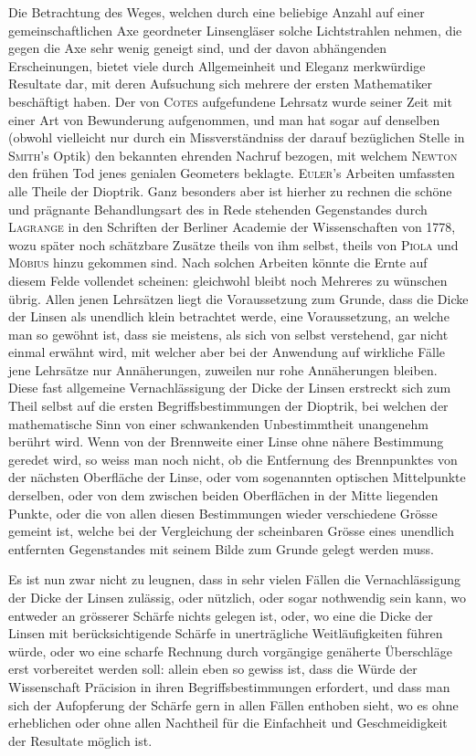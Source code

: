 Die Betrachtung des Weges, welchen durch eine beliebige Anzahl auf einer
gemeinschaftlichen Axe geordneter Linsengläser solche Lichtstrahlen nehmen, die
gegen die Axe sehr wenig geneigt sind, und der davon abhängenden Erscheinungen,
bietet viele durch Allgemeinheit und Eleganz merkwürdige Resultate
dar, mit deren Aufsuchung sich mehrere der ersten Mathematiker beschäftigt
haben. Der von \textsc{Cotes} aufgefundene Lehrsatz wurde seiner Zeit mit einer Art
von Bewunderung aufgenommen, und man hat sogar auf denselben (obwohl
vielleicht nur durch ein Missverständniss der darauf bezüglichen Stelle in \textsc{Smith}’s
Optik) den bekannten ehrenden Nachruf bezogen, mit welchem \textsc{Newton} den
frühen Tod jenes genialen Geometers beklagte. \textsc{Euler}’s Arbeiten umfassten alle
Theile der Dioptrik. Ganz besonders aber ist hierher zu rechnen die schöne
und prägnante Behandlungsart des in Rede stehenden Gegenstandes durch \textsc{Lagrange}
in den Schriften der Berliner Academie der Wissenschaften von 1778,
wozu später noch schätzbare Zusätze theils von ihm selbst, theils von \textsc{Piola}
und \textsc{Möbius} hinzu gekommen sind. Nach solchen Arbeiten könnte die Ernte
auf diesem Felde vollendet
\clearpage
{}
\noindent
scheinen: gleichwohl bleibt noch Mehreres zu wünschen übrig. Allen
jenen Lehrsätzen liegt die Voraussetzung zum Grunde, dass die Dicke der Linsen
als unendlich klein betrachtet werde, eine Voraussetzung, an welche man so
gewöhnt ist, dass sie meistens, als sich von selbst verstehend, gar nicht einmal
erwähnt wird, mit welcher aber bei der Anwendung auf wirkliche Fälle jene
Lehrsätze nur Annäherungen, zuweilen nur rohe Annäherungen bleiben. Diese
fast allgemeine Vernachlässigung der Dicke der Linsen erstreckt sich zum Theil
selbst auf die ersten Begriffsbestimmungen der Dioptrik, bei welchen der mathematische
Sinn von einer schwankenden Unbestimmtheit unangenehm berührt
wird. Wenn von der Brennweite einer Linse ohne nähere Bestimmung geredet
wird, so weiss man noch nicht, ob die Entfernung des Brennpunktes von der
nächsten Oberfläche der Linse, oder vom sogenannten optischen Mittelpunkte
derselben, oder von dem zwischen beiden Oberflächen in der Mitte liegenden
Punkte, oder die von allen diesen Bestimmungen wieder verschiedene Grösse
gemeint ist, welche bei der Vergleichung der scheinbaren Grösse eines unendlich
entfernten Gegenstandes mit seinem Bilde zum Grunde gelegt werden muss.

Es ist nun zwar nicht zu leugnen, dass in sehr vielen Fällen die Vernachlässigung
der Dicke der Linsen zulässig, oder nützlich, oder sogar nothwendig
sein kann, wo entweder an grösserer Schärfe nichts gelegen ist, oder, wo eine
die Dicke der Linsen mit berücksichtigende Schärfe in unerträgliche Weitläufigkeiten
führen würde, oder wo eine scharfe Rechnung durch vorgängige genäherte
Überschläge erst vorbereitet werden soll: allein eben so gewiss ist, dass die
Würde der Wissenschaft Präcision in ihren Begriffsbestimmungen erfordert, und
dass man sich der Aufopferung der Schärfe gern in allen Fällen enthoben sieht,
wo es ohne erheblichen oder ohne allen Nachtheil für die Einfachheit und
Geschmeidigkeit der Resultate möglich ist.

